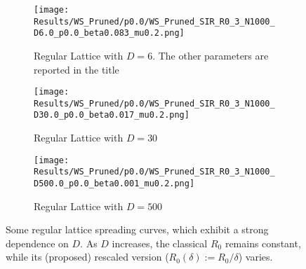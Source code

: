 \documentclass[a4paper,10pt,twoside]{book} %
\theoremstyle{definition}
\begin{document}
\begin{figure}
    \centering
    \begin{subfigure}[t]{\textwidth}
        \centering
        \texttt{[image: Results/WS\_Pruned/p0.0/WS\_Pruned\_SIR\_R0\_3\_N1000\_D6.0\_p0.0\_beta0.083\_mu0.2.png]} 
        \caption{Regular Lattice with $D = 6$. The other parameters are reported in the title} \label{fig:RegLat_R0maj1_D6}
    \end{subfigure}
	\vfill
    \begin{subfigure}[t]{\textwidth}
        \centering
        \texttt{[image: Results/WS\_Pruned/p0.0/WS\_Pruned\_SIR\_R0\_3\_N1000\_D30.0\_p0.0\_beta0.017\_mu0.2.png]} 
        \caption{Regular Lattice with $D = 30$} \label{fig:RegLat_R0maj1_D30}
    \end{subfigure}
    \vspace{1cm}
    \begin{subfigure}[t]{\textwidth}
        \centering
        \texttt{[image: Results/WS\_Pruned/p0.0/WS\_Pruned\_SIR\_R0\_3\_N1000\_D500.0\_p0.0\_beta0.001\_mu0.2.png]} 
        \caption{Regular Lattice with $D = 500$} \label{fig:RegLat_R0maj1_D500}
    \end{subfigure}
    \caption{Some regular lattice spreading curves, which exhibit a strong dependence on $D$. As $D$ increases, the classical $R_0$ remains constant, while its (proposed) rescaled version ($R_0(\delta):=R_0 / \delta$) varies.}
\end{figure}

\newpage
\end{document}
